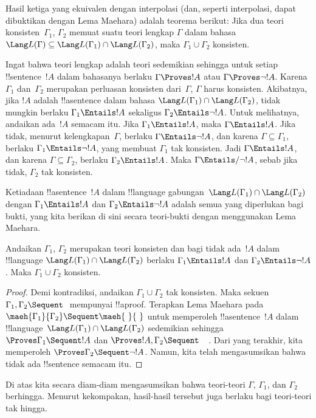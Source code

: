 \documentclass[../../../include/open-logic-section]{subfiles}
\begin{document}
Hasil ketiga yang ekuivalen dengan interpolasi (dan, seperti interpolasi,
dapat dibuktikan dengan Lema Maehara) adalah teorema berikut: Jika dua teori
konsisten~$\Gamma_1$, $\Gamma_2$ memuat suatu teori lengkap $\Gamma$ dalam
bahasa~$\Lang L(\Gamma) \subseteq \Lang L(\Gamma_1) \cap \Lang
L(\Gamma_2)$, maka $\Gamma_1 \cup \Gamma_2$ konsisten.

Ingat bahwa teori lengkap adalah teori sedemikian sehingga untuk setiap
!!{sentence}~$!A$ dalam bahasanya berlaku $\Gamma \Proves !A$ atau $\Gamma
\Proves \lnot !A$. Karena $\Gamma_1$ dan~$\Gamma_2$ merupakan perluasan
konsisten dari~$\Gamma$, $\Gamma$ harus konsisten. Akibatnya, jika $!A$
adalah !!a{sentence} dalam bahasa $\Lang L(\Gamma_1) \cap \Lang
L(\Gamma_2)$, tidak mungkin berlaku $\Gamma_1 \Entails !A$ sekaligus
$\Gamma_2 \Entails \lnot !A$. Untuk melihatnya, andaikan ada~$!A$ semacam
itu. Jika $\Gamma_1 \Entails !A$, maka $\Gamma \Entails !A$. Jika tidak,
menurut kelengkapan~$\Gamma$, berlaku $\Gamma \Entails \lnot !A$, dan
karena $\Gamma \subseteq \Gamma_1$, berlaku $\Gamma_1 \Entails \lnot !A$,
yang membuat $\Gamma_1$ tak konsisten. Jadi $\Gamma \Entails !A$, dan
karena $\Gamma \subseteq \Gamma_2$, berlaku $\Gamma_2 \Entails !A$. Maka
$\Gamma \Entails/ \lnot !A$, sebab jika tidak, $\Gamma_2$ tak konsisten.

Ketiadaan !!a{sentence}~$!A$ dalam !!{language} gabungan~$\Lang
L(\Gamma_1) \cap \Lang L(\Gamma_2)$ dengan $\Gamma_1 \Entails !A$ dan
$\Gamma_2 \Entails \lnot !A$ adalah semua yang diperlukan bagi bukti,
yang kita berikan di sini secara teori-bukti dengan menggunakan Lema
Maehara.

\begin{thm}
Andaikan $\Gamma_1$, $\Gamma_2$ merupakan teori konsisten dan bagi tidak
ada~$!A$ dalam !!{language} $\Lang L(\Gamma_1) \cap \Lang L(\Gamma_2)$
berlaku $\Gamma_1 \Entails !A$ dan $\Gamma_2 \Entails \lnot !A$. Maka
$\Gamma_1 \cup \Gamma_2$ konsisten.
\end{thm}

\begin{proof}
  Demi kontradiksi, andaikan $\Gamma_1 \cup \Gamma_2$ tak konsisten. Maka sekuen
  $\Gamma_1, \Gamma_2 \Sequent \ $ mempunyai !!a{proof}. Terapkan Lema
  Maehara pada $\maeh{\Gamma_1}{\Gamma_2} \Sequent \maeh{\ }{\ }$ untuk
  memperoleh !!a{sentence}~$!A$ dalam !!{language}~$\Lang L(\Gamma_1)
  \cap \Lang L(\Gamma_2)$ sedemikian sehingga $\Proves \Gamma_1 \Sequent
  !A$ dan $\Proves !A, \Gamma_2 \Sequent \quad$. Dari yang terakhir, kita
  memperoleh $\Proves \Gamma_2 \Sequent \lnot !A$. Namun, kita telah
  mengasumsikan bahwa tidak ada !!{sentence} semacam itu.
\end{proof}

Di atas kita secara diam-diam mengasumsikan bahwa teori-teori $\Gamma$,
$\Gamma_1$, dan $\Gamma_2$ berhingga. Menurut kekompakan, hasil-hasil
tersebut juga berlaku bagi teori-teori tak hingga.
\end{document}
